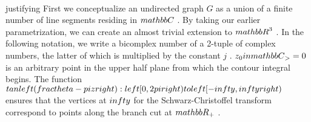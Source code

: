 \documentclass[preview]{standalone}
\begin{document}
\begin{center}
\quad\\justifying {First we conceptualize an undirected graph  ${G}$  as a union of a finite number of line segments residing in  ${\quad\\mathbb{C}}$ . By taking our earlier parametrization, we can create an almost trivial extension to  ${\quad\\mathbb{R}}^{3}$ . In the following notation, we write a bicomplex number of a 2-tuple of complex numbers, the latter of which is multiplied by the constant  ${j}$ .  ${z}_0\quad\\in{\quad\\mathbb{C}}_>={0}$  is an arbitrary point in the upper half plane from which the contour integral begins. The function  ${\quad\\tan\quad\\left(\quad\\frac{{{\quad\\theta}-{\quad\\pi}z\quad\\right)}}}:{\quad\\left[{0},{2}{\quad\\pi}\quad\\right)}\quad\\to{\quad\\left[-\quad\\infty,\quad\\infty\quad\\right)}$  ensures that the vertices at  $\quad\\infty$  for the Schwarz-Christoffel transform correspond to points along the branch cut at  ${\quad\\mathbb{R}}_+$ .}
\end{center}
\end{document}
